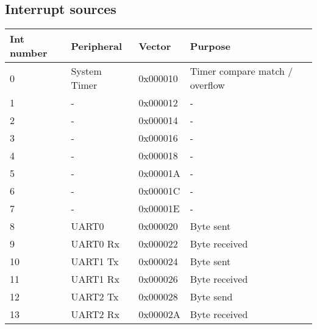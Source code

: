 \subsection{Interrupt sources}

\begin{table}[]
    \centering
    \begin{tabular}{|l|l|l|l|}
        \hline
        \textbf{Int number} & \textbf{Peripheral} & \textbf{Vector} & \textbf{Purpose}               \\ \hline
        0                   & System Timer        & 0x000010        & Timer compare match / overflow \\ \hline
        1                   & -                   & 0x000012        & -                              \\ \hline
        2                   & -                   & 0x000014        & -                              \\ \hline
        3                   & -                   & 0x000016        & -                              \\ \hline
        4                   & -                   & 0x000018        & -                              \\ \hline
        5                   & -                   & 0x00001A        & -                              \\ \hline
        6                   & -                   & 0x00001C        & -                              \\ \hline
        7                   & -                   & 0x00001E        & -                              \\ \hline
        8                   & UART0               & 0x000020        & Byte sent                      \\ \hline
        9                   & UART0 Rx            & 0x000022        & Byte received                  \\ \hline
        10                  & UART1 Tx            & 0x000024        & Byte sent                      \\ \hline
        11                  & UART1 Rx            & 0x000026        & Byte received                  \\ \hline
        12                  & UART2 Tx            & 0x000028        & Byte send                      \\ \hline
        13                  & UART2 Rx            & 0x00002A        & Byte received                  \\ \hline

\end{tabular}
\end{table}
